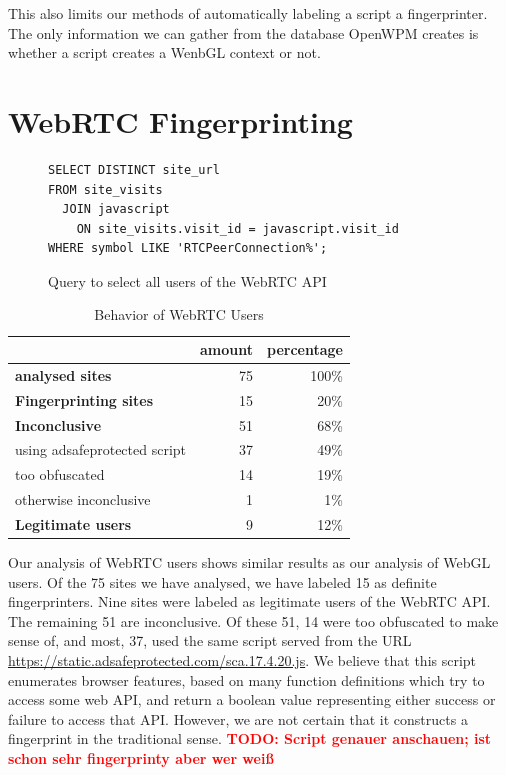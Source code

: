 \documentclass[
    fontsize=12pt,
    headings=small,
    parskip=half,
    bibliography=totoc,
    numbers=noenddot,
    open=any
    ]{scrreprt}
\newcommand{\todo}[1]{\textcolor{red}{\textbf{TODO: #1}}}
\begin{document}
This also limits our methods of automatically labeling a script a fingerprinter.
The only information we can gather from the database OpenWPM creates
is whether a script creates a WenbGL context or not.


\section{WebRTC Fingerprinting}
\begin{figure}
\begin{verbatim}
SELECT DISTINCT site_url
FROM site_visits
  JOIN javascript
    ON site_visits.visit_id = javascript.visit_id
WHERE symbol LIKE 'RTCPeerConnection%';
\end{verbatim}
\caption{Query to select all users of the WebRTC API}
\label{code:webrtc_query}
\end{figure}

\begin{table}
\centering
\caption{Behavior of WebRTC Users}
\begin{tabular}{l r r}
    \toprule
    & amount & percentage \\
    \midrule
    \textbf{analysed sites} & 75 & 100\% \\
    \midrule
    \textbf{Fingerprinting sites} & 15 & 20\% \\
    \midrule
    \textbf{Inconclusive} & 51 & 68\% \\
    using adsafeprotected script & 37 & 49\% \\
    too obfuscated & 14 & 19\% \\
    otherwise inconclusive & 1 & 1\% \\
    \midrule
    \textbf{Legitimate users} & 9 & 12\% \\
    \bottomrule
\end{tabular}
\label{table:webrtc_users}
\end{table}

Our analysis of WebRTC users shows similar results as our analysis of WebGL users.
Of the 75 sites we have analysed, we have labeled 15 as definite fingerprinters.
Nine sites were labeled as legitimate users of the WebRTC API. The remaining 51 are inconclusive.
Of these 51, 14 were too obfuscated to make sense of, and most, 37, used the same script
served from the URL \url{https://static.adsafeprotected.com/sca.17.4.20.js}.
We believe that this script enumerates browser features, based on many function definitions
which try to access some web API, and return a boolean value representing either success
or failure to access that API.
However, we are not certain that it constructs a fingerprint in the traditional sense.
\todo{Script genauer anschauen; ist schon sehr fingerprinty aber wer weiß}
\end{document}
